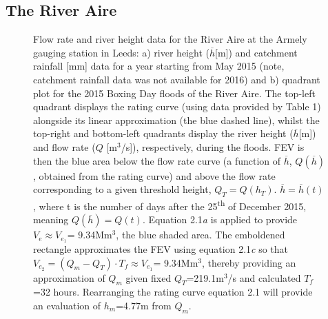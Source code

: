 \documentclass[11pt,a4paper]{article}
\begin{document}
\subsection{The River Aire}
\begin{figure}[H]
\centering
{}
\hfill
{}
\caption{Flow rate and river height data for the River Aire at the Armely gauging station in Leeds: a) river height ($\overline{h}$[m]) \cite{Aire} and catchment rainfall [mm] data \cite{NRFA} for a year starting from May 2015 (note, catchment rainfall data was not available for 2016) and b) quadrant plot for the 2015 Boxing Day floods of the River Aire. The top-left quadrant displays the rating curve (using data provided by Table 1) alongside its linear approximation (the blue dashed line), whilst the top-right and bottom-left quadrants display the river height ($\overline{h}$[m]) and flow rate ($Q$ [m$^3$/s]), respectively, during the floods. FEV is then the blue area below the flow rate curve (a function of $\overline{h}$, $Q(\overline{h})$, obtained from the rating curve) and above the flow rate corresponding to a given threshold height, $Q_T =Q(h_T)$. $\overline{h}=\overline{h}(t)$, where t is the number of days after the 25\textsuperscript{th} of December 2015, meaning $Q(\overline{h})=Q(t)$. Equation 2.1\textit{a} is applied to provide $V_e \approx V_{e_1}$= 9.34Mm$^3$, the blue shaded area. The emboldened rectangle approximates the FEV using equation 2.1\textit{c} so that $V_{e_2}= (Q_m -Q_T )\cdot T_f \approx V_{e_1}$= 9.34Mm$^3$, thereby providing an approximation of $Q_m$ given fixed $Q_T$=219.1m$^3$/s and calculated $T_f$=32 hours. Rearranging the rating curve equation 2.1 will provide an evaluation of $h_m$=4.77m from $Q_m$.}
\end{figure}
\end{document}
